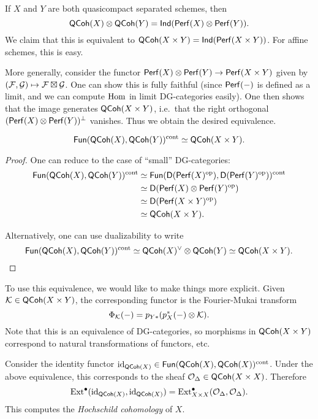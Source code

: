 \documentclass{amsart}
\begin{document}
If $X$ and $Y$ are both quasicompact separated schemes, then
\[
	\mathsf{QCoh}(X) \otimes \mathsf{QCoh}(Y) = \mathsf{Ind}(\mathsf{Perf}(X) \otimes \mathsf{Perf}(Y)).
\]
We claim that this is equivalent to $\mathsf{QCoh}(X \times Y) = \mathsf{Ind}(\mathsf{Perf}(X \times Y))$.
For affine schemes, this is easy.

More generally, consider the functor $\mathsf{Perf}(X) \otimes \mathsf{Perf}(Y) \to \mathsf{Perf}(X \times Y)$ given by $(\mathcal{F}, \mathcal{G}) \mapsto \mathcal{F} \boxtimes \mathcal{G}$.
One can show this is fully faithful (since $\mathsf{Perf}(-)$ is defined as a limit, and we can compute $\operatorname{Hom}$ in limit DG-categories easily).
One then shows that the image generates $\mathsf{QCoh}(X \times Y)$, i.e.\ that the right orthogonal $(\mathsf{Perf}(X) \otimes \mathsf{Perf}(Y))^\perp$ vanishes.
Thus we obtain the desired equivalence.

\begin{cor}
	\[
		\mathsf{Fun}(\mathsf{QCoh}(X), \mathsf{QCoh}(Y))^{\mathrm{cont}} \simeq \mathsf{QCoh}(X \times Y).
	\]
\end{cor}

\begin{proof}
	One can reduce to the case of ``small'' DG-categories:
	\begin{align*}
		\mathsf{Fun}(\mathsf{QCoh}(X), \mathsf{QCoh}(Y))^{\mathrm{cont}} &\simeq \mathsf{Fun}(\mathsf{D}(\mathsf{Perf}(X)^{\mathrm{op}}), \mathsf{D}(\mathsf{Perf}(Y)^{\mathrm{op}}))^{\mathrm{cont}} \\
		&\simeq \mathsf{D}(\mathsf{Perf}(X) \otimes \mathsf{Perf}(Y)^{\mathrm{op}}) \\
		&\simeq \mathsf{D}(\mathsf{Perf}(X \times Y)^{\mathrm{op}}) \\
		&\simeq \mathsf{QCoh}(X \times Y).
	\end{align*}

	Alternatively, one can use dualizability to write 
	\[
		\mathsf{Fun}(\mathsf{QCoh}(X), \mathsf{QCoh}(Y))^{\mathrm{cont}} \simeq \mathsf{QCoh}(X)^\vee \otimes \mathsf{QCoh}(Y) \simeq \mathsf{QCoh}(X \times Y). \qedhere
	\]
\end{proof}

To use this equivalence, we would like to make things more explicit.
Given $\mathcal{K} \in \mathsf{QCoh}(X \times Y)$, the corresponding functor is the Fourier-Mukai transform
\[
	\Phi_{\mathcal{K}}(-) = p_{Y*} (p_X^*(-) \otimes \mathcal{K}).
\]
Note that this is an equivalence of DG-categories, so morphisms in $\mathsf{QCoh}(X \times Y)$ correspond to natural transformations of functors, etc.

\begin{ex}
	Consider the identity functor $\operatorname{id}_{\mathsf{QCoh}(X)} \in \mathsf{Fun}(\mathsf{QCoh}(X), \mathsf{QCoh}(X))^{\mathrm{cont}}$.
	Under the above equivalence, this corresponds to the sheaf $\mathcal{O}_\Delta \in \mathsf{QCoh}(X \times X)$.
	Therefore
	\[
		\operatorname{Ext}^\bullet(\operatorname{id}_{\mathsf{QCoh}(X)}, \operatorname{id}_{\mathsf{QCoh}(X)}) = \operatorname{Ext}^\bullet_{X \times X}(\mathcal{O}_\Delta, \mathcal{O}_\Delta).
	\]
	This computes the \emph{Hochschild cohomology} of $X$.
\end{ex}
\end{document}
